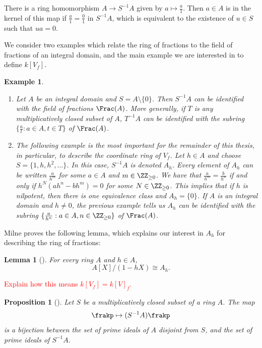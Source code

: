 \documentclass[12pt]{amsart}
\theoremstyle{plain}
\newtheorem{lemma}[theorem]{Lemma}
\newtheorem{proposition}[theorem]{Proposition}
\newtheorem{example}[theorem]{Example}
\begin{document}
There is a ring homomorphism $A\to S^{-1}A$ given by $a \mapsto \frac{a}{1}$.
Then $a\in A$ is in the kernel of this map if $\frac{a}{1}=\frac{0}{1}$ in $S^{-1}A$, which is equivalent to the existence of $u\in S$ such that $u a = 0$.

We consider two examples which relate the ring of fractions to the field of fractions of an integral domain, and the main example we are interested in to define $k[V_f]$.

\begin{example}
\begin{enumerate}
\item
Let $A$ be an integral domain and $S = A \setminus \{0\}$.
Then $S^{-1}A$ can be identified with the field of fractions $\Frac(A)$.
More generally, if $T$ is any multiplicatively closed subset of $A$, $T^{-1}A$ can be identified with the subring $\{\frac{a}{t} : a\in A, t \in T\}$ of $\Frac(A)$.

\item
The following example is the most important for the remainder of this thesis, in particular, to describe the coordinate ring of $V_f$.
Let $h \in A$ and choose $S = \{1, h, h^2, \ldots\}$.
In this case, $S^{-1}A$ is denoted $A_h$.
Every element of $A_h$ can be written $\frac{a}{h^m}$ for some $a \in A$ and $m \in \ZZ_{\ge 0}$.
We have that $\frac{a}{h^m} = \frac{b}{h^n}$ if and only if $h^N (ah^n - b h^m)=0$ for some $N \in \ZZ_{\ge 0}$.
This implies that if $h$ is nilpotent, then there is one equivalence class and $A_h = \{0\}$.
If $A$ is an integral domain and $h \ne 0$, the previous example tells us $A_h$ can be identified with the subring $\{\frac{a}{h^n} : a \in A, n \in \ZZ_{\ge 0}\}$ of $\Frac(A)$.
\end{enumerate}
\end{example}

Milne proves the following lemma, which explains our interest in $A_h$ for describing the ring of fractions:

\begin{lemma}[{\cite[Lemma 1.13]{Milne13}}]
For every ring $A$ and $h \in A$,
$$A[X]/(1-hX) \cong A_h.$$
\end{lemma}

\textcolor{red}{Explain how this means $k[V_f] = k[V]_f$.}

\begin{proposition}[{\cite[Proposition 1.14]{Milne13}}]
Let $S$ be a multiplicatively closed subset of a ring $A$.
The map
$$\frakp \mapsto (S^{-1}A) \frakp$$
is a bijection between the set of prime ideals of $A$ disjoint from $S$, and the set of prime ideals of $S^{-1}A$.
\end{proposition}
\end{document}
